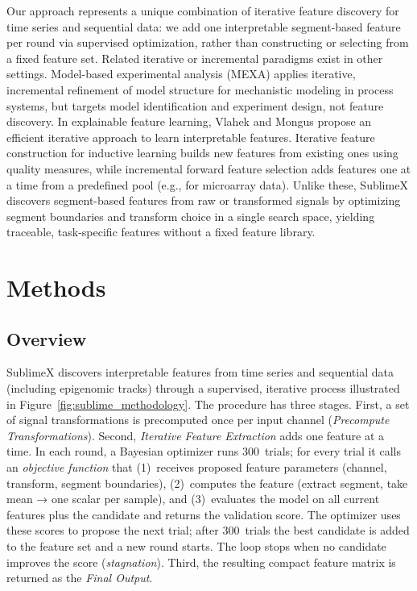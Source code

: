 \documentclass[times, review, 10pt]{elsarticle}
\begin{document}
Our approach represents a unique combination of iterative feature discovery for time series and sequential data: we add one interpretable segment-based feature 
per round via supervised optimization, rather than constructing or selecting from a fixed feature set. Related iterative or incremental 
paradigms exist in other settings. Model-based experimental analysis (MEXA) \cite{marquardt2004model} applies iterative, 
incremental refinement of model structure for mechanistic modeling in process systems, but targets model identification and experiment design, not feature discovery. 
In explainable feature learning, Vlahek and Mongus \cite{vlahek2021efficient} propose an efficient iterative approach to learn interpretable features. 
Iterative feature construction for inductive learning \cite{piramuthu2009iterative} builds new features from existing ones using quality measures, 
while incremental forward feature selection \cite{lee2008incremental} adds features one at a time from a predefined pool (e.g., for microarray data). 
Unlike these, SublimeX discovers segment-based features from raw or transformed signals by optimizing segment boundaries and transform choice in a single search space, 
yielding traceable, task-specific features without a fixed feature library.



\section{Methods}

\subsection{Overview}
SublimeX discovers interpretable features from time series and sequential
data (including epigenomic tracks) through a supervised, iterative process
illustrated in Figure~\ref{fig:sublime_methodology}.  The procedure
has three stages.  First, a set of signal transformations is
precomputed once per input channel (\emph{Precompute
Transformations}).  Second, \emph{Iterative Feature Extraction} adds one
feature at a time.  In each round, a Bayesian optimizer runs 300~trials;
for every trial it calls an \emph{objective function} that (1)~receives
proposed feature parameters (channel, transform, segment boundaries),
(2)~computes the feature (extract segment, take mean → one scalar per
sample), and (3)~evaluates the model on all current features plus the
candidate and returns the validation score.  The optimizer uses these
scores to propose the next trial; after 300~trials the best candidate is
added to the feature set and a new round starts.  The loop stops when no
candidate improves the score (\emph{stagnation}).  Third, the resulting
compact feature matrix is returned as the \emph{Final Output}.
\end{document}
